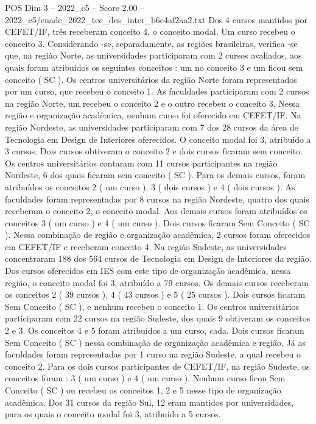 \begin{textsample}{POS Dim 3 – 2022\_c5 – Score 2.00 – 2022\_c5/enade\_2022\_tec\_des\_inter\_b6c4af2aa2.txt}
Dos 4 cursos mantidos por CEFET/IF, três receberam conceito 4, o conceito modal.
Um curso recebeu o conceito 3.
Considerando -se, separadamente, as regiões brasileiras, verifica -se que, na região Norte, as universidades participaram com 2 cursos avaliados, aos quais foram atribuídos os seguintes conceitos : um no conceito 3 e um ficou sem conceito ( SC ).
Os centros universitários da região Norte foram representados por um curso, que recebeu o conceito 1.
As faculdades participaram com 2 cursos na região Norte, um recebeu o conceito 2 e o outro recebeu o conceito 3.
Nessa região e organização acadêmica, nenhum curso foi oferecido em CEFET/IF.
Na região Nordeste, as universidades participaram com 7 dos 28 cursos da área de Tecnologia em Design de Interiores oferecidos.
O conceito modal foi 3, atribuído a 3 cursos.
Dois cursos obtiveram o conceito 2 e dois cursos ficaram sem conceito.
Os centros universitários contaram com 11 cursos participantes na região Nordeste, 6 dos quais ficaram sem conceito ( SC ).
Para os demais cursos, foram atribuídos os conceitos 2 ( um curso ), 3 ( dois cursos ) e 4 ( dois cursos ).
As faculdades foram representadas por 8 cursos na região Nordeste, quatro dos quais receberam o conceito 2, o conceito modal.
Aos demais cursos foram atribuídos os conceitos 3 ( um curso ) e 4 ( um curso ).
Dois cursos ficaram Sem Conceito ( SC ).
Nessa combinação de região e organização acadêmica, 2 cursos foram oferecidos em CEFET/IF e receberam conceito 4.
Na região Sudeste, as universidades concentraram 188 dos 564 cursos de Tecnologia em Design de Interiores da região.
Dos cursos oferecidos em IES com este tipo de organização acadêmica, nessa região, o conceito modal foi 3, atribuído a 79 cursos.
Os demais cursos receberam os conceitos 2 ( 39 cursos ), 4 ( 43 cursos ) e 5 ( 25 cursos ).
Dois cursos ficaram Sem Conceito ( SC ), e nenhum recebeu o conceito 1.
Os centros universitários participaram com 22 cursos na região Sudeste, dos quais 9 obtiveram os conceitos 2 e 3.
Os conceitos 4 e 5 foram atribuídos a um curso, cada.
Dois cursos ficaram Sem Conceito ( SC ) nessa combinação de organização acadêmica e região.
Já as faculdades foram representadas por 1 curso na região Sudeste, a qual recebeu o conceito 2.
Para os dois cursos participantes de CEFET/IF, na região Sudeste, os conceitos foram : 3 ( um curso ) e 4 ( um curso ).
Nenhum curso ficou Sem Conceito ( SC ) ou recebeu os conceitos 1, 2 e 5 nesse tipo de organização acadêmica.
Dos 31 cursos da região Sul, 12 eram mantidos por universidades, para os quais o conceito modal foi 3, atribuído a 5 cursos.

\end{textsample}
